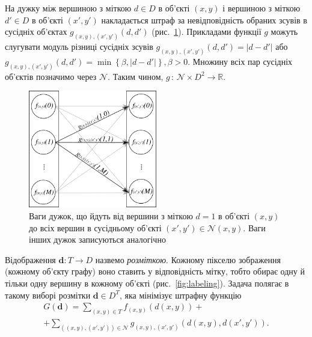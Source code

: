 На дужку між вершиною з міткою $d \in D$ в об'єкті $\left(x, y \right)$
і вершиною з міткою $d' \in D$ в об'єкті $\left(x', y' \right)$
накладається штраф за невідповідність обраних зсувів в сусідніх об'єктах
$g_{\left(x, y \right), \left(x', y' \right)} \left(d, d' \right)$
(рис.~\ref{fig:neighbor:edge:weights}).
Прикладами функції $g$ можуть слугувати модуль різниці сусідніх зсувів
$g_{\left(x, y \right), \left(x', y' \right)} \left(d, d' \right) = \left| d - d' \right|$
або
$g_{\left(x, y \right), \left(x', y' \right)} \left(d, d' \right) =
    \min \left\{ \beta, \left| d - d' \right| \right\}, \beta > 0$.
Множину всіх пар сусідніх об'єктів позначимо через $\mathcal{N}$.
Таким чином, $g \, : \, \mathcal{N} \times D^2 \to \mathbb{R}$.

\begin{figure}[h]
  \centering
  \includegraphics[width=0.5\textwidth]{images/neighbor_edge_weights}
  \caption{Ваги дужок, що йдуть від вершини з міткою $d = 1$ в об'єкті
           $\left(x, y \right)$ до всіх вершин в сусідньому об'єкті
           $\left(x', y' \right) \in \mathcal{N}\left(x, y \right)$.
           Ваги інших дужок записуються аналогічно}
  \label{fig:neighbor:edge:weights}
\end{figure}

Відображення $\pmb{d} : T \rightarrow D$ назвемо \textit{розміткою}.
Кожному пікселю зображення (кожному об'єкту графу)
воно ставить у відповідність мітку,
тобто обирає одну й тільки одну вершину в кожному об'єкті
(рис.~\ref{fig:labeling}).
Задача полягає в такому виборі розмітки $\pmb{d} \in D^T$,
яка мінімізує штрафну функцію
\begin{equation} \label{eq:overview:penalty}
\begin{gathered}
    G \left( \pmb{d} \right)
    = \sum \limits_{\left(x, y \right) \in T}
        f_{\left(x, y \right)} \left(d \left(x, y \right) \right) + \\
    + \sum \limits_{\left(\left(x, y \right), \left(x', y'\right) \right) \in \mathcal{N}}
        g_{\left(x, y \right), \left(x', y' \right)} \left(
            d \left( x, y \right), d \left( x', y' \right)
        \right).
\end{gathered}
\end{equation}

